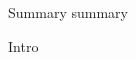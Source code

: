 




\begin{alertblock}{Summary}
    summary
\end{alertblock}\vspace{0.9cm}





  

\justifying
% 
{\rmfamily
Intro
}



        
